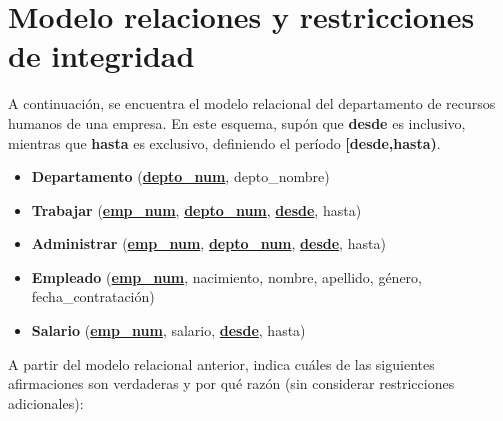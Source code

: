 \documentclass{article}
\begin{document}
\section{Modelo relaciones y restricciones de integridad}
A continuación, se encuentra el modelo relacional del departamento de recursos humanos de una empresa. En este esquema, supón que \textbf{desde} es inclusivo, mientras que \textbf{hasta} es exclusivo, definiendo el período \textbf{[desde,hasta)}.

\begin{itemize}
    \item \textbf{Departamento} (\textbf{\underline{depto\_num}}, depto\_nombre)
    
    \item \textbf{Trabajar} (\underline{\textbf{emp\_num}}, \underline{\textbf{depto\_num}}, \underline{\textbf{desde}}, hasta)
    
    \item \textbf{Administrar} (\underline{\textbf{emp\_num}}, \underline{\textbf{depto\_num}}, \underline{\textbf{desde}}, hasta)
    
    \item \textbf{Empleado} (\underline{\textbf{emp\_num}}, nacimiento, nombre, apellido, género, fecha\_contratación)
    
    \item \textbf{Salario} (\underline{\textbf{emp\_num}}, salario, \underline{\textbf{desde}}, hasta)
    
\end{itemize}

A partir del modelo relacional anterior, indica cuáles de las siguientes afirmaciones son verdaderas y por qué razón
(sin considerar restricciones adicionales):
\end{document}
